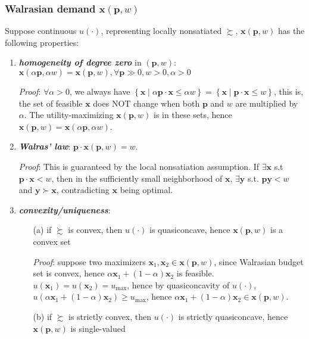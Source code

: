 \subsubsection*{Walrasian demand $\mathbf{x}(\mathbf{p},w)$}
Suppose continuous $u(\cdot)$, representing locally nonsatiated $\succsim$, $\mathbf{x}(\mathbf{p},w)$ has the following properties:
\begin{enumerate}
    \item \textit{\textbf{homogeneity of degree zero}} in $(\mathbf{p},w)$: $\mathbf{x}(\alpha\mathbf{p},\alpha w)=\mathbf{x}(\mathbf{p},w),\forall \mathbf{p}\gg 0,w>0,\alpha>0$
    
    \textit{Proof}: $\forall \alpha >0$, we always have $\left\{\mathbf{x}\mid \alpha\mathbf{p}\cdot\mathbf{x}\leq \alpha w\right\}=\left\{\mathbf{x}\mid \mathbf{p}\cdot\mathbf{x}\leq w\right\}$, this is, the set of feasible $\mathbf{x}$ does NOT change when both $\mathbf{p}$ and $w$ are multiplied by $\alpha$. The utility-maximizing $\mathbf{x}(\mathbf{p},w)$ is in these sets, hence $\mathbf{x}(\mathbf{p},w)=\mathbf{x}(\alpha\mathbf{p},\alpha w)$.
    \item \textit{\textbf{Walras' law}}: $\mathbf{p}\cdot \mathbf{x}(\mathbf{p},w)=w$. 
    
    \textit{Proof}: This is guaranteed by the local nonsatiation assumption. If $\exists \mathbf{x}$ s.t $\mathbf{p}\cdot \mathbf{x}<w$, then in the sufficiently small neighborhood of $\mathbf{x}$, $\exists\mathbf{y}$ s.t. $\mathbf{p}\mathbf{y}<w$ and $\mathbf{y}\succ \mathbf{x}$, contradicting $\mathbf{x}$ being optimal.
    \item \textit{\textbf{convexity/uniqueness}}:
    \begin{enumerate}
        \item[(a)] if $\succsim$ is convex, then $u(\cdot)$ is quasiconcave, hence $\mathbf{x}(\mathbf{p},w)$ is a convex set
        
        \textit{Proof}: suppose two maximizers $\mathbf{x}_1,\mathbf{x}_2\in\mathbf{x}(\mathbf{p},w)$, since Walrasian budget set is convex, hence $\alpha \mathbf{x}_1+(1-\alpha)\mathbf{x}_2$ is feasible. $u(\mathbf{x}_1)=u(\mathbf{x}_2)=u_{\max}$, hence by quasiconcavity of $u(\cdot)$, $u(\alpha \mathbf{x}_1+(1-\alpha)\mathbf{x}_2)\geq u_{\max}$, hence $\alpha \mathbf{x}_1+(1-\alpha)\mathbf{x}_2\in \mathbf{x}(\mathbf{p},w)$.
        \item[(b)] if $\succsim$ is strictly convex, then $u(\cdot)$ is strictly quasiconcave, hence $\mathbf{x}(\mathbf{p},w)$ is single-valued
        

\end{enumerate}
\end{enumerate}

